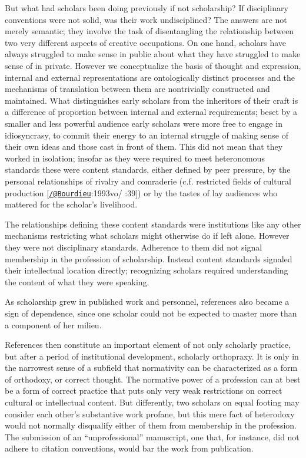 \documentclass[]{article}
\begin{document}
But what had scholars been doing previously if not scholarship? If
disciplinary conventions were not solid, was their work undisciplined?
The answers are not merely semantic; they involve the task of
disentangling the relationship between two very different aspects of
creative occupations. On one hand, scholars have always struggled to
make sense in public about what they have struggled to make sense of in
private. However we conceptualize the basis of thought and expression,
internal and external representations are ontologically distinct
processes and the mechanisms of translation between them are
nontrivially constructed and maintained. What distinguishes early
scholars from the inheritors of their craft is a difference of
proportion between internal and external requirements; beset by a
smaller and less powerful audience early scholars were more free to
engage in idiosyncrasy, to commit their energy to an internal struggle
of making sense of their own ideas and those cast in front of them. This
did not mean that they worked in isolation; insofar as they were
required to meet heteronomous standards these were content standards,
either defined by peer pressure, by the personal relationships of
rivalry and comraderie (c.f. restricted fields of cultural production
{[}\href{mailto:/@Bourdieu}{\nolinkurl{/@Bourdieu}}:1993vo/ :39{]}) or
by the tastes of lay audiences who mattered for the scholar's
livelihood.

The relationships defining these content standards were institutions
like any other mechanisms restricting what scholars might otherwise do
if left alone. However they were not disciplinary standards. Adherence
to them did not signal membership in the profession of scholarship.
Instead content standards signaled their intellectual location directly;
recognizing scholars required understanding the content of what they
were speaking.

As scholarship grew in published work and personnel, references also
became a sign of dependence, since one scholar could not be expected to
master more than a component of her milieu.

References then constitute an important element of not only scholarly
practice, but after a period of institutional development, scholarly
orthopraxy. It is only in the narrowest sense of a subfield that
normativity can be characterized as a form of orthodoxy, or correct
thought. The normative power of a profession can at best be a form of
correct practice that puts only very weak restrictions on correct
cultural or intellectual content. But differently, two scholars on equal
footing may consider each other's substantive work profane, but this
mere fact of heterodoxy would not normally disqualify either of them
from membership in the profession. The submission of an
``unprofessional'' manuscript, one that, for instance, did not adhere to
citation conventions, would bar the work from publication.
\end{document}
